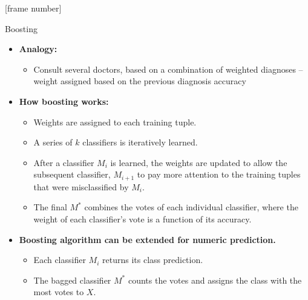 \documentclass[aspectratio=169,t,table]{beamer}
\begin{document}
  {
    [frame number]
    \begin{frame}{Boosting}
      \begin{itemize}
        \item \textbf{Analogy:}
        \begin{itemize}
          \item Consult several doctors, based on a combination of weighted diagnoses -- weight assigned based on the previous diagnosis accuracy
        \end{itemize}
        \item \textbf{How boosting works:}
        \begin{itemize}
          \item Weights are assigned to each training tuple.
          \item A series of $k$ classifiers is iteratively learned.
          \item After a classifier $M_i$ is learned, the weights are updated to allow the subsequent classifier, $M_{i+1}$ to pay more attention to the training tuples that were misclassified by $M_i$.
          \item The final $M^*$ combines the votes of each individual classifier, where the weight of each classifier's vote is a function of its accuracy.
        \end{itemize}
        \item \textbf{Boosting algorithm can be extended for numeric prediction.}
        \begin{itemize}
          \item Each classifier $M_i$ returns its class prediction.
          \item The bagged classifier $M^*$ counts the votes and assigns the class with the most votes to $X$.
        \end{itemize}
      \end{itemize}
    \end{frame}
  }
\end{document}
